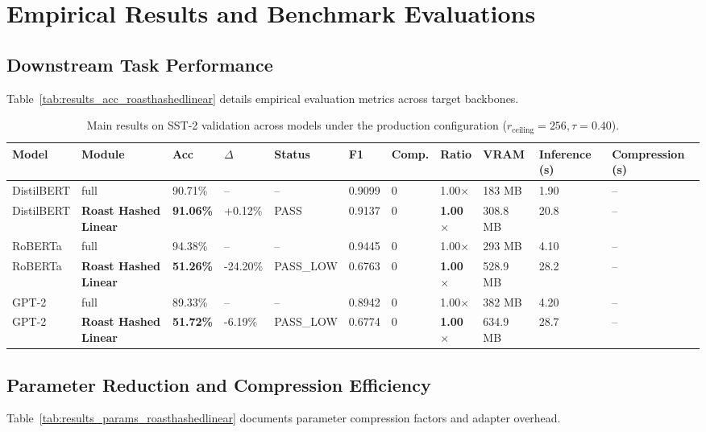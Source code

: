 \section{Empirical Results and Benchmark Evaluations}

\subsection{Downstream Task Performance}
Table~\ref{tab:results_acc_roasthashedlinear} details empirical evaluation metrics across target backbones.

\begin{table}[t]
\centering
\small
\begin{tabular}{lllllllllll}
\toprule
\textbf{Model} & \textbf{Module} & \textbf{Acc} & \textbf{$\Delta$} & \textbf{Status} & \textbf{F1} & \textbf{Comp.} & \textbf{Ratio} & \textbf{VRAM} & \textbf{Inference (s)} & \textbf{Compression (s)} \\
\midrule
DistilBERT & full & 90.71\% & -- & -- & 0.9099 & 0 & 1.00$\times$ & 183 MB & 1.90 & -- \\
DistilBERT & \textbf{Roast Hashed Linear} & \textbf{91.06\%} & +0.12\% & PASS & 0.9137 & 0 & \textbf{1.00$\times$} & 308.8 MB & 20.8 & -- \\
RoBERTa & full & 94.38\% & -- & -- & 0.9445 & 0 & 1.00$\times$ & 293 MB & 4.10 & -- \\
RoBERTa & \textbf{Roast Hashed Linear} & \textbf{51.26\%} & -24.20\% & PASS\_LOW & 0.6763 & 0 & \textbf{1.00$\times$} & 528.9 MB & 28.2 & -- \\
GPT-2 & full & 89.33\% & -- & -- & 0.8942 & 0 & 1.00$\times$ & 382 MB & 4.20 & -- \\
GPT-2 & \textbf{Roast Hashed Linear} & \textbf{51.72\%} & -6.19\% & PASS\_LOW & 0.6774 & 0 & \textbf{1.00$\times$} & 634.9 MB & 28.7 & -- \\
\bottomrule
\end{tabular}
\caption{Main results on SST-2 validation across models under the production configuration ($r_{\mathrm{ceiling}}=256, \tau=0.40$).}
\label{tab:main_sst2}
\end{table}

\subsection{Parameter Reduction and Compression Efficiency}
Table~\ref{tab:results_params_roasthashedlinear} documents parameter compression factors and adapter overhead.

